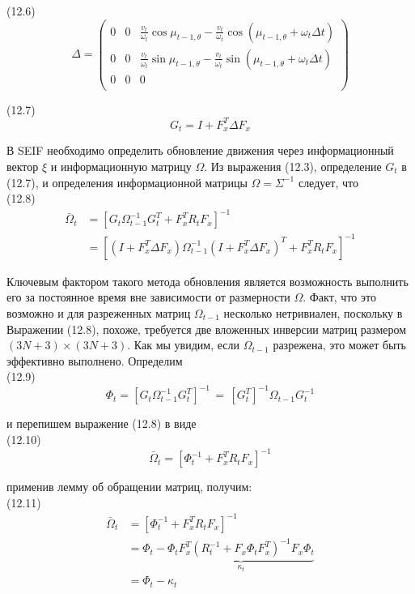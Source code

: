 \documentclass[10pt,a4paper]{article}
\begin{document}
(12.6)
$$\varDelta=\left(\begin{array}{ccc}
0&0&\frac{v_t}{\omega_t}\cos\mu_{t-1,\theta}-\frac{v_t}{\omega_t}\cos(\mu_{t-1,\theta}+\omega_t\varDelta t)\\
0&0&\frac{v_t}{\omega_t}\sin\mu_{t-1,\theta}-\frac{v_t}{\omega_t}\sin(\mu_{t-1,\theta}+\omega_t\varDelta t)\\
0&0&0\\
\end{array} \right)$$

(12.7)
$$G_t=I+F_x^T\varDelta F_x$$

В SEIF необходимо определить обновление движения через информационный вектор $\xi$ и информационную матрицу $\varOmega$.  Из выражения (12.3), определение $G_t$   в (12.7), и определения информационной матрицы $\varOmega=\varSigma^{-1}$ следует, что\\

(12.8)
\begin{equation*}
\begin{split}
\bar{\varOmega}_t&=[G_t\varOmega_{t-1}^{-1}G_t^T+F_x^TR_tF_x]^{-1}\\
&=[(I+F_x^T\varDelta F_x)\varOmega_{t-1}^{-1}(I+F_x^T\varDelta F_x)^T+F_x^TR_tF_x]^{-1}
\end{split}
\end{equation*}

Ключевым фактором такого метода обновления является возможность выполнить его за постоянное время вне зависимости от размерности $\varOmega$. Факт, что это возможно и для разреженных матриц $\varOmega_{t-1}$ несколько нетривиален, поскольку в Выражении (12.8), похоже, требуется две вложенных инверсии матриц размером $(3N+3)\times(3N+3)$. Как мы увидим, если $\varOmega_{t-1}$ разрежена, это может быть эффективно выполнено. Определим\\

(12.9)
$$\varPhi_t=[G_t\varOmega_{t-1}^{-1}G_t^T]^{-1}\,=\,[G_t^T]^{-1}\varOmega_{t-1}G_t^{-1}$$

и перепишем выражение (12.8) в виде\\

(12.10)
$$\bar{\varOmega}_t=[\varPhi_t^{-1}+F_x^TR_tF_x]^{-1}$$

применив лемму об обращении матриц, получим:\\

(12.11)
\begin{equation*}
\begin{split}
\bar{\varOmega}_t&=[\varPhi_t^{-1}+F_x^TR_tF_x]^{-1}\\
&=\varPhi_t-\underbrace{\varPhi_tF_x^T(R_t^{-1}+F_x\varPhi_tF_x^T)^{-1}F_x\varPhi_t}_{\kappa_t}\\&=\varPhi_t-\kappa_t
\end{split}
\end{equation*}
\end{document}

